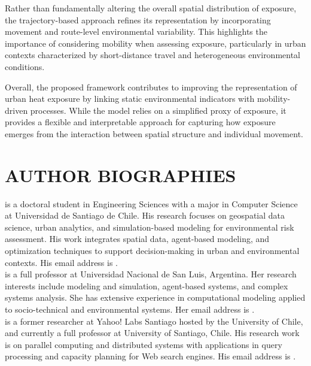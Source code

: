\documentclass{wscpaperproc}
\theoremstyle{wsc}
\begin{document}
Rather than fundamentally altering the overall spatial distribution of exposure, the trajectory-based approach refines its representation by incorporating movement and route-level environmental variability. This highlights the importance of considering mobility when assessing exposure, particularly in urban contexts characterized by short-distance travel and heterogeneous environmental conditions.

Overall, the proposed framework contributes to improving the representation of urban heat exposure by linking static environmental indicators with mobility-driven processes. While the model relies on a simplified proxy of exposure, it provides a flexible and interpretable approach for capturing how exposure emerges from the interaction between spatial structure and individual movement.



\footnotesize






\section*{AUTHOR BIOGRAPHIES}

 is a doctoral student in Engineering Sciences with a major in Computer Science at Universidad de Santiago de Chile. His research focuses on geospatial data science, urban analytics, and simulation-based modeling for environmental risk assessment. His work integrates spatial data, agent-based modeling, and optimization techniques to support decision-making in urban and environmental contexts. His email address is .\\

 is a full professor  at Universidad Nacional de San Luis, Argentina. Her research interests include modeling and simulation, agent-based systems, and complex systems analysis. She has extensive experience in computational modeling applied to socio-technical and environmental systems. Her email address is .\\

 is a former researcher at Yahoo! Labs Santiago hosted by the University of Chile, and currently a
full professor at University of Santiago, Chile.  His research work is on parallel computing and distributed systems with applications in query
processing and capacity planning for Web search engines. His email address is .
\end{document}
